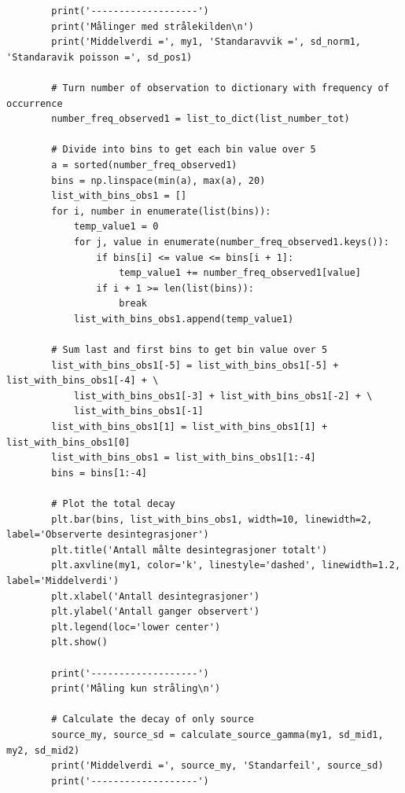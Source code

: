\documentclass[twocolumn, 11pt]{article} %
\begin{document}
\begin{lstlisting}
        print('-------------------')
        print('Målinger med strålekilden\n')
        print('Middelverdi =', my1, 'Standaravvik =', sd_norm1, 'Standaravik poisson =', sd_pos1)

        # Turn number of observation to dictionary with frequency of occurrence
        number_freq_observed1 = list_to_dict(list_number_tot)

        # Divide into bins to get each bin value over 5
        a = sorted(number_freq_observed1)
        bins = np.linspace(min(a), max(a), 20)
        list_with_bins_obs1 = []
        for i, number in enumerate(list(bins)):
            temp_value1 = 0
            for j, value in enumerate(number_freq_observed1.keys()):
                if bins[i] <= value <= bins[i + 1]:
                    temp_value1 += number_freq_observed1[value]
                if i + 1 >= len(list(bins)):
                    break
            list_with_bins_obs1.append(temp_value1)

        # Sum last and first bins to get bin value over 5
        list_with_bins_obs1[-5] = list_with_bins_obs1[-5] + list_with_bins_obs1[-4] + \
            list_with_bins_obs1[-3] + list_with_bins_obs1[-2] + \
            list_with_bins_obs1[-1]
        list_with_bins_obs1[1] = list_with_bins_obs1[1] + list_with_bins_obs1[0]
        list_with_bins_obs1 = list_with_bins_obs1[1:-4]
        bins = bins[1:-4]

        # Plot the total decay
        plt.bar(bins, list_with_bins_obs1, width=10, linewidth=2, label='Observerte desintegrasjoner')
        plt.title('Antall målte desintegrasjoner totalt')
        plt.axvline(my1, color='k', linestyle='dashed', linewidth=1.2, label='Middelverdi')
        plt.xlabel('Antall desintegrasjoner')
        plt.ylabel('Antall ganger observert')
        plt.legend(loc='lower center')
        plt.show()

        print('-------------------')
        print('Måling kun stråling\n')

        # Calculate the decay of only source
        source_my, source_sd = calculate_source_gamma(my1, sd_mid1, my2, sd_mid2)
        print('Middelverdi =', source_my, 'Standarfeil', source_sd)
        print('-------------------')


    \end{lstlisting}

\newpage
\end{document}
